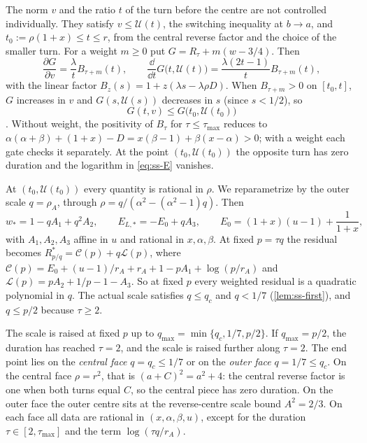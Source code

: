  The norm $v$ and the ratio $t$ of the turn before the centre are not
controlled individually. They satisfy $v\le\mathcal U(t)$, the switching inequality at $b\to a$,
and $t_0:=\rho(1+x)\le t\le r$, from the central reverse factor and the choice of the smaller
turn. For a weight $m\ge0$ put $G=R_\tau+m(w-3/4)$. Then
\[
  \frac{\partial G}{\partial v}=\frac{\lambda}{t}B_{\tau+m}(t),\qquad
  \frac{\dd}{\dd t}G\bigl(t,\mathcal U(t)\bigr)=\frac{\lambda(2t-1)}{t}B_{\tau+m}(t),
\]
with the linear factor $B_z(s)=1+z(\lambda s-\lambda\rho D)$. When $B_{\tau+m}>0$ on $[t_0,t]$,
$G$ increases in $v$ and $G(s,\mathcal U(s))$ decreases in $s$ (since $s<1/2$), so
\begin{equation}\label{eq:ss-envelope}
  G(t,v)\le G\bigl(t_0,\mathcal U(t_0)\bigr)
\end{equation}. Without weight, the positivity of $B_\tau$ for
$\tau\le\tau_{\max}$ reduces to
$\alpha(\alpha+\beta)+(1+x)-D=x(\beta-1)+\beta(x-\alpha)>0$; with a weight each gate checks it separately. At the point
$(t_0,\mathcal U(t_0))$ the opposite turn has zero duration and the logarithm in \eqref{eq:ss-E}
vanishes.

 At $(t_0,\mathcal U(t_0))$ every quantity is rational in $\rho$. We
reparametrize by the outer scale $q=\rho_A$, through $\rho=q/(\alpha^2-(\alpha^2-1)q)$. Then
\begin{equation}\label{eq:ss-scale}
  w_*=1-qA_1+q^2A_2,\qquad E_{L,*}=-E_0+qA_3,\qquad
  E_0=(1+x)(u-1)+\frac{1}{1+x},
\end{equation}
with $A_1,A_2,A_3$ affine in $u$ and rational in $x,\alpha,\beta$. At fixed
$p=\tau q$ the residual becomes $R^*_{p/q}=\mathcal C(p)+q\mathcal L(p)$, where
$\mathcal C(p)=E_0+(u-1)/r_A+r_A+1-pA_1+\log(p/r_A)$ and $\mathcal L(p)=pA_2+1/p-1-A_3$. So at
fixed $p$ every weighted residual is a quadratic polynomial in $q$. The actual scale satisfies
$q\le q_c$ and $q<1/7$ (\cref{lem:ss-first}), and $q\le p/2$ because $\tau\ge2$.

 The scale is raised at fixed $p$ up to $q_{\max}=\min\{q_c,1/7,p/2\}$. If
$q_{\max}=p/2$, the duration has reached $\tau=2$, and the scale is raised further along $\tau=2$.
The end point lies on the \emph{central face} $q=q_c\le1/7$ or on the \emph{outer face}
$q=1/7\le q_c$. On the central face $\rho=r^2$, that is $(a+C)^2=a^2+4$: the central reverse
factor is one when both turns equal $C$, so the central piece has zero duration. On the outer face
the outer centre sits at the reverse-centre scale bound $A^2=2/3$. On each face all data are rational in $(x,\alpha,\beta,u)$,
except for the duration $\tau\in[2,\tau_{\max}]$ and the term $\log(\tau q/r_A)$.

